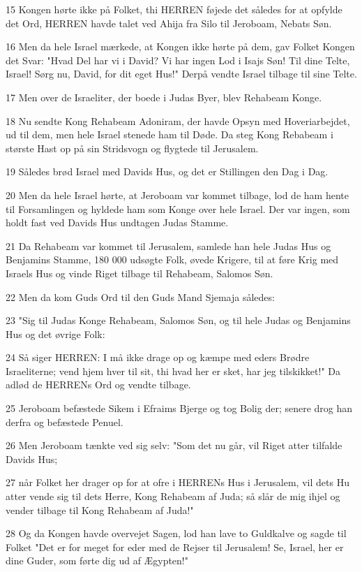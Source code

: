 \par 15 Kongen hørte ikke på Folket, thi HERREN føjede det således for at opfylde det Ord, HERREN havde talet ved Ahija fra Silo til Jeroboam, Nebats Søn.
\par 16 Men da hele Israel mærkede, at Kongen ikke hørte på dem, gav Folket Kongen det Svar: "Hvad Del har vi i David? Vi har ingen Lod i Isajs Søn! Til dine Telte, Israel! Sørg nu, David, for dit eget Hus!" Derpå vendte Israel tilbage til sine Telte.
\par 17 Men over de Israeliter, der boede i Judas Byer, blev Rehabeam Konge.
\par 18 Nu sendte Kong Rehabeam Adoniram, der havde Opsyn med Hoveriarbejdet, ud til dem, men hele Israel stenede ham til Døde. Da steg Kong Rebabeam i største Hast op på sin Stridsvogn og flygtede til Jerusalem.
\par 19 Således brød Israel med Davids Hus, og det er Stillingen den Dag i Dag.
\par 20 Men da hele Israel hørte, at Jeroboam var kommet tilbage, lod de ham hente til Forsamlingen og hyldede ham som Konge over hele Israel. Der var ingen, som holdt fast ved Davids Hus undtagen Judas Stamme.
\par 21 Da Rehabeam var kommet til Jerusalem, samlede han hele Judas Hus og Benjamins Stamme, 180 000 udsøgte Folk, øvede Krigere, til at føre Krig med Israels Hus og vinde Riget tilbage til Rehabeam, Salomos Søn.
\par 22 Men da kom Guds Ord til den Guds Mand Sjemaja således:
\par 23 "Sig til Judas Konge Rehabeam, Salomos Søn, og til hele Judas og Benjamins Hus og det øvrige Folk:
\par 24 Så siger HERREN: I må ikke drage op og kæmpe med eders Brødre Israeliterne; vend hjem hver til sit, thi hvad her er sket, har jeg tilskikket!" Da adlød de HERRENs Ord og vendte tilbage.
\par 25 Jeroboam befæstede Sikem i Efraims Bjerge og tog Bolig der; senere drog han derfra og befæstede Penuel.
\par 26 Men Jeroboam tænkte ved sig selv: "Som det nu går, vil Riget atter tilfalde Davids Hus;
\par 27 når Folket her drager op for at ofre i HERRENs Hus i Jerusalem, vil dets Hu atter vende sig til dets Herre, Kong Rehabeam af Juda; så slår de mig ihjel og vender tilbage til Kong Rehabeam af Juda!"
\par 28 Og da Kongen havde overvejet Sagen, lod han lave to Guldkalve og sagde til Folket "Det er for meget for eder med de Rejser til Jerusalem! Se, Israel, her er dine Guder, som førte dig ud af Ægypten!"
